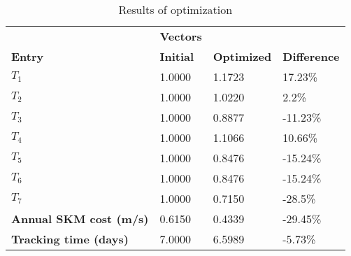 \begin{table}[H]
\centering
\begin{tabular}{llll}
\textbf{}      & \cellcolor[HTML]{EFEFEF}\textbf{Vectors} & \textbf{} & \textbf{}         \\
\rowcolor[HTML]{EFEFEF} 
\textbf{Entry} & \textbf{Initial} & \textbf{Optimized} & \textbf{Difference} \\
$T_1$ & 1.0000 & 1.1723 & 17.23\% \\ 
$T_2$ & 1.0000 & 1.0220 & 2.2\% \\ 
$T_3$ & 1.0000 & 0.8877 & -11.23\% \\ 
$T_4$ & 1.0000 & 1.1066 & 10.66\% \\ 
$T_5$ & 1.0000 & 0.8476 & -15.24\% \\ 
$T_6$ & 1.0000 & 0.8476 & -15.24\% \\ 
$T_7$ & 1.0000 & 0.7150 & -28.5\% \\ 
\rowcolor[HTML]{EFEFEF} 
\textbf{Annual SKM cost (m/s)}  & 0.6150 & 0.4339 & -29.45\% \\ 
\rowcolor[HTML]{EFEFEF} 
\textbf{Tracking time (days)}  & 7.0000 & 6.5989 & -5.73\% \\ 
\end{tabular}
\caption{Results of optimization}
\label{tab:OptimizationAnalysis}
\end{table}